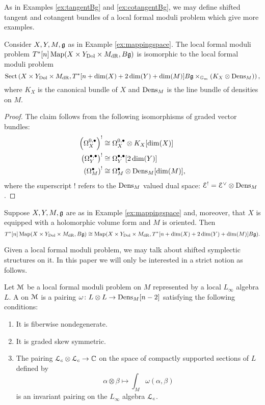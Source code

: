 \documentclass[10pt, oneside]{article}
\begin{document}
As in Examples \ref{ex:tangentBg} and \ref{ex:cotangentBg}, we may define shifted tangent and cotangent bundles of a local formal moduli problem which give more examples.

\begin{prop}
Consider $X,Y,M, \mathfrak g$ as in Example \ref{ex:mappingspace}. The local formal moduli problem $T^*[n]\operatorname{Map}(X\times Y_{\mathrm{Dol}}\times M_{\mathrm{dR}}, B\mathfrak g)$ is isomorphic to the local formal moduli problem
\[\mathrm{Sect}\left(X\times Y_{\mathrm{Dol}}\times M_{\mathrm{dR}}, T^*[n+\dim(X)+2\dim(Y)+\dim(M)] B\mathfrak g\times_{\mathbb{G}_m} (K_X\otimes \mathrm{Dens}_M)\right),\]
where $K_X$ is the canonical bundle of $X$ and $\mathrm{Dens}_M$ is the line bundle of densities on $M$.
\label{prop:mapintocotangent}
\end{prop}
\begin{proof}
The claim follows from the following isomorphisms of graded vector bundles:
\begin{align*}
\left(\Omega^{0, \bullet}_X\right)^!&\cong \Omega^{0, \bullet}_X\otimes K_X[\dim(X)] \\
\left(\Omega^{\bullet, \bullet}_Y\right)^!&\cong \Omega^{\bullet, \bullet}_Y[2\dim(Y)] \\
\left(\Omega^\bullet_M\right)^!&\cong \Omega^\bullet_M\otimes \mathrm{Dens}_M[\dim(M)],
\end{align*}
where the superscript $!$ refers to the $\mathrm{Dens}_M$ valued dual space: $\mathcal{E}^! = \mathcal{E}^\vee \otimes \mathrm{Dens}_M$.
\end{proof}

\begin{corollary}
Suppose $X,Y,M,\mathfrak g$ are as in Example \ref{ex:mappingspace} and, moreover, that $X$ is equipped with a holomorphic volume form and $M$ is oriented. Then
\[T^*[n]\operatorname{Map}(X\times Y_{\mathrm{Dol}}\times M_{\mathrm{dR}}, B\mathfrak g)\cong \operatorname{Map}(X\times Y_{\mathrm{Dol}}\times M_{\mathrm{dR}}, T^*[n+\dim(X)+2\dim(Y)+\dim(M)] B\mathfrak g).\]
\label{cor:mapintocotangent}
\end{corollary}

Given a local formal moduli problem, we may talk about shifted symplectic structures \cite{PTVV} on it. In this paper we will only be interested in a strict notion as follows.

\begin{definition}
Let $\mathcal M$ be a local formal moduli problem on $M$ represented by a local $L_\infty$ algebra $L$. A  on $\mathcal M$ is a pairing $\omega\colon L\otimes L\rightarrow \mathrm{Dens}_M[n-2]$ satisfying the following conditions:
\begin{enumerate}
\item It is fiberwise nondegenerate.

\item It is graded skew symmetric.

\item The pairing $\mathcal L_c\otimes \mathcal L_c \rightarrow \mathbb C$ on the space of compactly supported sections of $L$ defined by
\[\alpha\otimes \beta \mapsto \int_M \omega( \alpha, \beta)\]
is an invariant pairing on the $L_\infty$ algebra $\mathcal L_c$.
\end{enumerate}
\end{definition}
\end{document}
